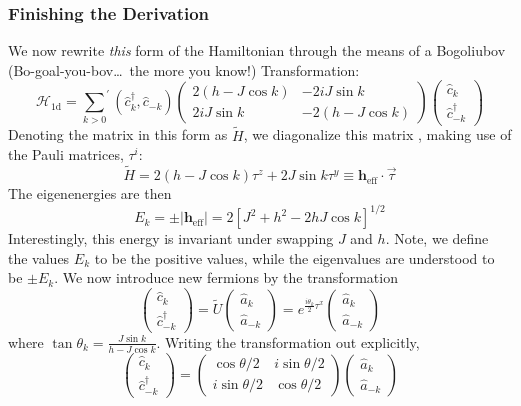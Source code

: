 \documentclass{article}
\newcommand{\norm}[1]{\left|#1\right|}
\begin{document}
	\subsubsection{Finishing the Derivation}
	We now rewrite \emph{this} form of the Hamiltonian through the means of a Bogoliubov (Bo-goal-you-bov\ldots\ the more you know!) Transformation:
	$$\mathcal{H}_{\mathrm{1d}}={\sum_{k>0}}^\prime (\hat{c}_k^\dagger,\hat{c}_{-k})\begin{pmatrix} 2(h-J\cos k) & -2iJ\sin k\\ 2iJ\sin k & -2(h-J\cos k)\end{pmatrix}\begin{pmatrix} \hat{c}_k\\ \hat{c}_{-k}^\dagger \end{pmatrix}$$
	Denoting the matrix in this form as $\tilde{H}$, we diagonalize this matrix , making use of the Pauli matrices, $\tau^i$:
	$$\tilde{H}=2(h-J\cos k)\tau^z+2J\sin k\tau^y\equiv \mathbf{h}_{\mathrm{eff}}\cdot\vec{\tau}$$
	The eigenenergies are then 
	$$E_k=\pm\norm{\mathbf{h}_{\mathrm{eff}}}=2\left[J^2+h^2-2hJ\cos k\right]^{1/2}$$
	Interestingly, this energy is invariant under swapping $J$ and $h$. Note, we define the values $E_k$ to be the positive values, while the eigenvalues are understood to be $\pm E_k$. We now introduce new fermions by the transformation 
	$$\begin{pmatrix} \hat{c}_k\\ \hat{c}_{-k}^\dagger\end{pmatrix}=\tilde{U}\begin{pmatrix}\hat{a}_k\\\hat{a}_{-k}\end{pmatrix}=e^{\frac{i\theta_k}{2}\tau^x}\begin{pmatrix}\hat{a}_k\\\hat{a}_{-k}\end{pmatrix}$$
	where $\tan\theta_k=\frac{J\sin k}{h-J\cos k}$. Writing the transformation out explicitly, 
	$$\begin{pmatrix} \hat{c}_k\\\hat{c}_{-k}^\dagger \end{pmatrix}=\begin{pmatrix}\cos\theta/2 & i\sin\theta/2\\ i\sin\theta/2 & \cos\theta/2\end{pmatrix}\begin{pmatrix}\hat{a}_k\\\hat{a}_{-k}\end{pmatrix}$$
\end{document}
